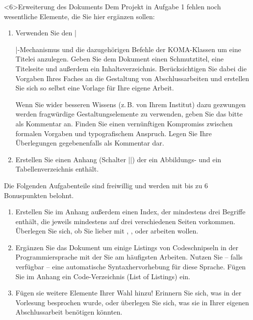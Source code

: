 \documentclass[
	vorläufig=false, 
	blattnr=7,
	ausgabe=2018-12-03,
	abgabe=2018-12-10,
	lösung=true,
	shortverb,
]{../tex/latexkurs-exercise}
\begin{document}
\begin{aufgabe}[6]<6>{Erweiterung des Dokuments}
Dem Projekt in Aufgabe 1 fehlen noch wesentliche Elemente, die Sie hier ergänzen sollen:
\begin{enumerate}[label=\alph*)]
\item Verwenden Sie den |\maketitle|-Mechanismus und die dazugehörigen Befehle der  KOMA-Klassen um eine Titelei anzulegen. Geben Sie dem Dokument einen Schmutztitel, eine Titelseite und außerdem ein Inhaltsverzeichnis. Berücksichtigen Sie dabei die Vorgaben Ihres Faches an die Gestaltung von Abschlussarbeiten und erstellen Sie sich so selbst eine Vorlage für Ihre eigene Arbeit.

Wenn Sie wider besseren Wissens (z.\,B. von Ihrem Institut) dazu gezwungen werden fragwürdige Gestaltungselemente zu verwenden, geben Sie das bitte als Kommentar an. Finden Sie einen vernünftigen Kompromiss zwischen formalen Vorgaben und typografischem Anspruch. Legen Sie Ihre Überlegungen gegebenenfalls als Kommentar dar.
\item Erstellen Sie einen Anhang (Schalter |\appendix|) der ein Abbildungs- und ein Tabellenverzeichnis enthält.
\end{enumerate}
Die Folgenden Aufgabenteile sind freiwillig und werden mit bis zu 6 Bonuspunkten belohnt.
\begin{enumerate}[resume,label=\alph*)]
\item Erstellen Sie im Anhang außerdem einen Index, der mindestens drei Begriffe enthält, die jeweils mindestens auf drei verschiedenen Seiten vorkommen. Überlegen Sie sich, ob Sie lieber mit , ,  oder  arbeiten wollen.
\item Ergänzen Sie das Dokument um einige Listings von Codeschnipseln in der Programmiersprache mit der Sie am häufigsten Arbeiten. Nutzen Sie – falls verfügbar – eine automatische Syntaxhervorhebung für diese Sprache. Fügen Sie im Anhang ein Code-Verzeichnis (List of Listings) ein.
\item Fügen sie weitere Elemente Ihrer Wahl hinzu! Erinnern Sie sich, was in der Vorlesung besprochen wurde, oder überlegen Sie sich, was sie in Ihrer eigenen Abschlussarbeit benötigen könnten.
\end{enumerate}
\end{aufgabe}
\end{document}
